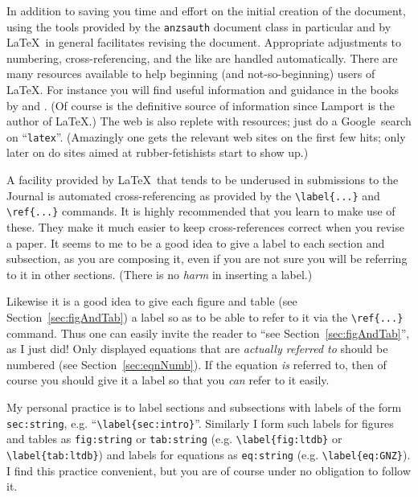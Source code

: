 \documentclass[times, doublespace]{anzsauth}
\begin{document}
In addition to saving you time and effort on the initial creation
of the document, using the tools provided by the \texttt{anzsauth}
document class in particular and by \LaTeX\ in general facilitates
revising the document.  Appropriate adjustments to numbering,
cross-referencing, and the like are handled automatically.
There are many resources available to help beginning (and
not-so-beginning) users of \LaTeX.  For instance you will find
useful information and guidance in the books by \cite{KopkaDaly2003,
Lamport1994} and \cite{MittelbachGoossens2004}.  (Of course \cite{Lamport1994}
is the definitive source of information since Lamport is the
author of \LaTeX.)  The web is also replete with resources;
just do a Google\texttrademark\ search on ``\texttt{latex}''.
(Amazingly one gets the relevant web sites on the first few hits;
only later on do sites aimed at rubber-fetishists start to show up.)

A facility provided by \LaTeX\ that tends to be underused in submissions
to the Journal is automated cross-referencing as provided by the
\verb!\label{...}! and \verb!\ref{...}! commands.  It is highly recommended
that you learn to make use of these.  They make it much easier to keep
cross-references correct when you revise a paper.  It seems to me to be
a good idea to give a label to each section and subsection, as you are
composing it, even if you are not sure you will be referring to it
in other sections.  (There is no \emph{harm} in inserting a label.)

Likewise it is a good idea to give each figure and table (see
Section~\ref{sec:figAndTab}) a label so as to be able to refer to
it via the \verb!\ref{...}!  command.  Thus one can easily invite
the reader to ``see Section~\ref{sec:figAndTab}'', as I just did!
Only displayed equations that are \emph{actually referred to}
should be numbered (see Section~\ref{sec:eqnNumb}).  If the equation
\emph{is} referred to, then of course you should give it a label so
that you \emph{can} refer to it easily.

My personal practice is to label sections and subsections with labels
of the form \texttt{sec:string}, e.g. ``\verb!\label{sec:intro}!''.
Similarly I form such labels for figures and tables
as \texttt{fig:string} or \texttt{tab:string} (e.g.
\verb!\label{fig:ltdb}! or \verb!\label{tab:ltdb}!) and labels
for equations as \texttt{eq:string} (e.g. \verb!\label{eq:GNZ}!).
I find this practice convenient, but you are of course under no
obligation to follow it.
\end{document}
